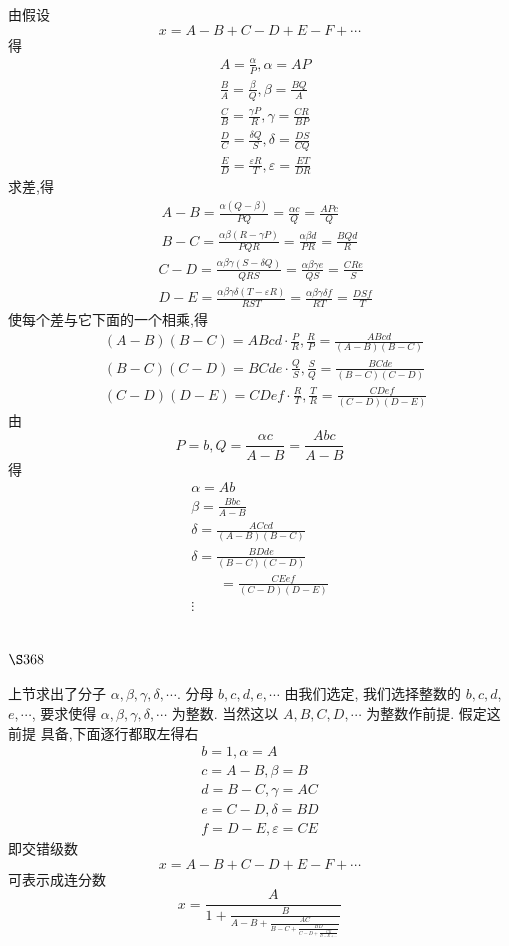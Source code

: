 由假设
\[
x=A-B+C-D+E-F+\cdots
\]
得
\[
\begin{aligned}
& A=\frac{\alpha}{P}, \alpha=A P \\
& \frac{B}{A}=\frac{\beta}{Q}, \beta=\frac{B Q}{A} \\
& \frac{C}{B}=\frac{\gamma P}{R}, \gamma=\frac{C R}{B P} \\
& \frac{D}{C}=\frac{\delta Q}{S}, \delta=\frac{D S}{C Q} \\
& \frac{E}{D}=\frac{\varepsilon R}{T}, \varepsilon=\frac{E T}{D R}
\end{aligned}
\]
求差,得
\[
\begin{gathered}
A-B=\frac{\alpha(Q-\beta)}{P Q}=\frac{\alpha c}{Q}=\frac{A P c}{Q} \\
B-C=\frac{\alpha \beta(R-\gamma P)}{P Q R}=\frac{\alpha \beta d}{P R}=\frac{B Q d}{R}
\end{gathered}
\]
\[
\begin{aligned}
& C-D=\frac{\alpha \beta \gamma(S-\delta Q)}{Q R S}=\frac{\alpha \beta \gamma e}{Q S}=\frac{C R e}{S} \\
& D-E=\frac{\alpha \beta \gamma \delta(T-\varepsilon R)}{R S T}=\frac{\alpha \beta \gamma \delta f}{R T}=\frac{D S f}{T}
\end{aligned}
\]
使每个差与它下面的一个相乘,得
\[
\begin{aligned}
& (A-B)(B-C)=A B c d \cdot \frac{P}{R}, \frac{R}{P}=\frac{A B c d}{(A-B)(B-C)} \\
& (B-C)(C-D)=B C d e \cdot \frac{Q}{S}, \frac{S}{Q}=\frac{B C d e}{(B-C)(C-D)} \\
& (C-D)(D-E)=C D e f \cdot \frac{R}{T}, \frac{T}{R}=\frac{C D e f}{(C-D)(D-E)}
\end{aligned}
\]
由
\[
P=b, Q=\frac{\alpha c}{A-B}=\frac{A b c}{A-B}
\]
得
\[
\begin{gathered}
\alpha=A b \\
\beta=\frac{B b c}{A-B} \\
\delta=\frac{A C c d}{(A-B)(B-C)} \\
\delta=\frac{B D d e}{(B-C)(C-D)} \\
\qquad=\frac{C E e f}{(C-D)(D-E)} \\
\vdots
\end{gathered}
\]
\section{$\S 368$}

上节求出了分子 $\alpha, \beta, \gamma, \delta, \cdots$. 分母 $b, c, d, e, \cdots$ 由我们选定, 我们选择整数的 $b, c, d$, $e, \cdots$, 要求使得 $\alpha, \beta, \gamma, \delta, \cdots$ 为整数. 当然这以 $A, B, C, D, \cdots$ 为整数作前提. 假定这前提 具备,下面逐行都取左得右
\[
\begin{gathered}
b=1, \alpha=A \\
c=A-B, \beta=B \\
d=B-C, \gamma=A C \\
e=C-D, \delta=B D \\
f=D-E, \varepsilon=C E
\end{gathered}
\]
即交错级数
\[
x=A-B+C-D+E-F+\cdots
\]
可表示成连分数
\[
x=\frac{A}{1+\frac{B}{A-B+\frac{A C}{B-C+\frac{B D}{C-D+\frac{C E}{D-E+\cdots}}}}}
\]
